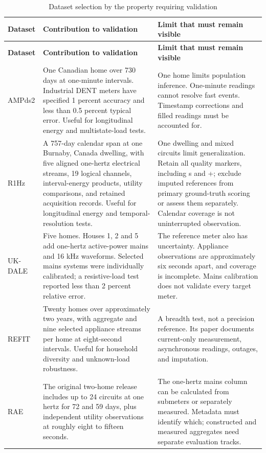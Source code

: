 \documentclass[11pt,letterpaper]{article}
\begin{document}
\begingroup\small\setlength{\tabcolsep}{4pt}
\begin{longtable}{|>{\centering\arraybackslash}p{0.924in}|>{\raggedright\arraybackslash}p{2.925in}|>{\raggedright\arraybackslash}p{2.617in}|}
\caption{Dataset selection by the property requiring validation}\\
\hline\rowcolor{HeaderGray}
\textbf{Dataset} & \textbf{Contribution to validation} & \textbf{Limit that must remain visible}\\\hline
\endfirsthead
\hline\rowcolor{HeaderGray}
\textbf{Dataset} & \textbf{Contribution to validation} & \textbf{Limit that must remain visible}\\\hline
\endhead
AMPds2 \cite{ref7} & One Canadian home over 730 days at one-minute intervals. Industrial DENT meters have specified 1 percent accuracy and less than 0.5 percent typical error. Useful for longitudinal energy and multistate-load tests. & One home limits population inference. One-minute readings cannot resolve fast events. Timestamp corrections and filled readings must be accounted for.\\\hline
R1Hz \cite{ref13} & A 757-day calendar span at one Burnaby, Canada dwelling, with five aligned one-hertz electrical streams, 19 logical channels, interval-energy products, utility comparisons, and retained acquisition records. Useful for longitudinal energy and temporal-resolution tests. & One dwelling and mixed circuits limit generalization. Retain all quality markers, including s and +; exclude imputed references from primary ground-truth scoring or assess them separately. Calendar coverage is not uninterrupted observation.\\\hline
UK-DALE \cite{ref8} & Five homes. Houses 1, 2 and 5 add one-hertz active-power mains and 16 kHz waveforms. Selected mains systems were individually calibrated; a resistive-load test reported less than 2 percent relative error. & The reference meter also has uncertainty. Appliance observations are approximately six seconds apart, and coverage is incomplete. Mains calibration does not validate every target meter.\\\hline
REFIT \cite{ref9} & Twenty homes over approximately two years, with aggregate and nine selected appliance streams per home at eight-second intervals. Useful for household diversity and unknown-load robustness. & A breadth test, not a precision reference. Its paper documents current-only measurement, asynchronous readings, outages, and imputation.\\\hline
RAE \cite{ref10} & The original two-home release includes up to 24 circuits at one hertz for 72 and 59 days, plus independent utility observations at roughly eight to fifteen seconds. & The one-hertz mains column can be calculated from submeters or separately measured. Metadata must identify which; constructed and measured aggregates need separate evaluation tracks.\\\hline

\end{longtable}
\end{document}
